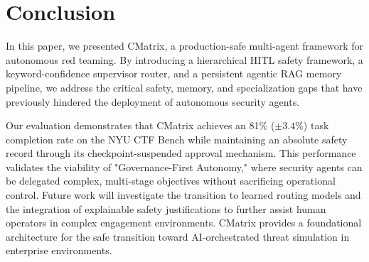 \documentclass[conference,compsoc]{IEEEtran}
\begin{document}
\section{Conclusion} \label{sec:conclusion}
In this paper, we presented CMatrix, a production-safe multi-agent framework for autonomous red teaming. By introducing a hierarchical HITL safety framework, a keyword-confidence supervisor router, and a persistent agentic RAG memory pipeline, we address the critical safety, memory, and specialization gaps that have previously hindered the deployment of autonomous security agents. 

Our evaluation demonstrates that CMatrix achieves an 81\% ($\pm 3.4\%$) task completion rate on the NYU CTF Bench while maintaining an absolute safety record through its checkpoint-suspended approval mechanism. This performance validates the viability of "Governance-First Autonomy," where security agents can be delegated complex, multi-stage objectives without sacrificing operational control. Future work will investigate the transition to learned routing models and the integration of explainable safety justifications to further assist human operators in complex engagement environments. CMatrix provides a foundational architecture for the safe transition toward AI-orchestrated threat simulation in enterprise environments.



\end{document}
